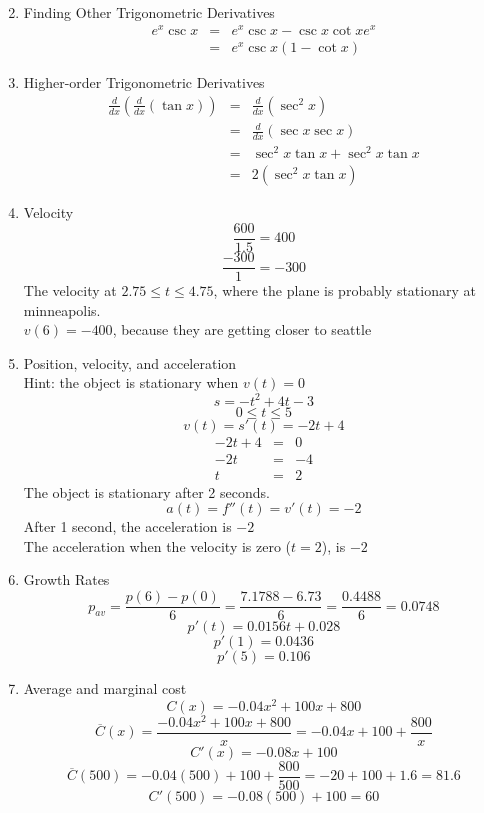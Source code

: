 \documentclass{article}
\begin{document}
\begin{enumerate}
\begin{eqnarray}
    \end{eqnarray}
    \item Finding Other Trigonometric Derivatives
    \begin{eqnarray}
        e^x \csc{x} &=& e^x\csc{x} - \csc{x}\cot{x}e^x \\
                    &=& e^x\csc{x}(1 - \cot{x})
    \end{eqnarray}
    \item Higher-order Trigonometric Derivatives
    \begin{eqnarray}
        \frac{d}{dx} \left(\frac{d}{dx} \left(\tan{x}\right)\right) &=& \frac{d}{dx} \left(\sec^2{x}\right) \\
                                                                    &=& \frac{d}{dx} \left(\sec{x}\sec{x}\right) \\
                                                                    &=& \sec^2{x}\tan{x} + \sec^2{x}\tan{x} \\
                                                                    &=& 2\left(\sec^2{x}\tan{x}\right)
    \end{eqnarray}
    \item Velocity
    $$\frac{600}{1.5} = 400$$
    $$\frac{-300}{1} = -300$$
    The velocity at $2.75 \leq t \leq 4.75$, where the plane is probably stationary at minneapolis. \\
    $v(6) = -400$, because they are getting closer to seattle
    \item Position, velocity, and acceleration
    \\ Hint: the object is stationary when $v(t) = 0$
    $$s = -t^2 + 4t - 3$$
    $$0 \leq t \leq 5$$
    $$v(t) = s'(t) = -2t + 4$$
    \begin{eqnarray}
        -2t + 4 &=& 0 \\
        -2t &=& -4 \\
        t &=& 2
    \end{eqnarray}
    The object is stationary after 2 seconds.
    $$a(t) = f''(t) = v'(t) = -2$$
    After 1 second, the acceleration is $-2$ \\
    The acceleration when the velocity is zero ($t = 2$), is $-2$
    \item Growth Rates
    $$p_{av} = \frac{p(6) - p(0)}{6} = \frac{7.1788 - 6.73}{6} = \frac{0.4488}{6} = 0.0748$$
    $$p'(t) = 0.0156t + 0.028$$
    $$p'(1) = 0.0436$$
    $$p'(5) = 0.106$$
    \item Average and marginal cost
    $$C(x) = -0.04x^2 + 100x + 800$$
    $$\overline{C}(x) = \frac{-0.04x^2 + 100x + 800}{x} = -0.04x + 100 + \frac{800}{x}$$
    $$C'(x) = -0.08x + 100$$
    $$\overline{C}(500) = -0.04(500) + 100 + \frac{800}{500} = -20 + 100 + 1.6 = 81.6$$
    $$C'(500) = -0.08(500) + 100 = 60$$
\end{enumerate}
\end{document}
